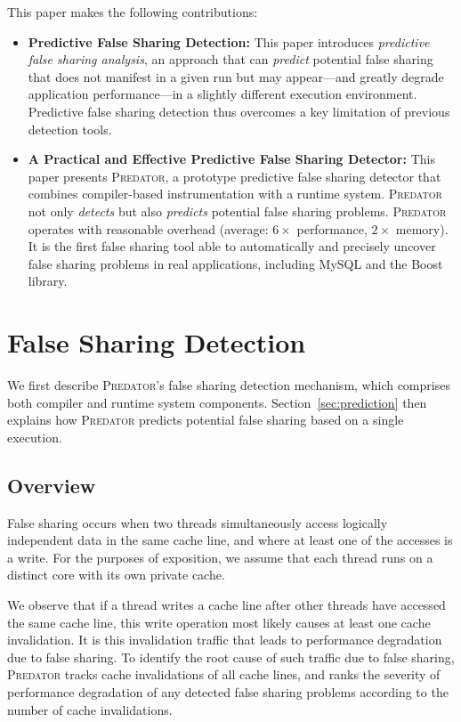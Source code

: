 \documentclass[10pt]{sigplanconf}
\newcommand{\Predator}{{\scshape Predator}}
\begin{document}
This paper makes the following contributions:

\begin{itemize}

\item
\textbf{Predictive False Sharing Detection:} This paper introduces \emph{predictive false sharing analysis}, an approach that can \emph{predict} potential false sharing that does not manifest in a given run but may appear---and greatly degrade application performance---in a slightly different execution environment. 
Predictive false sharing detection thus overcomes a key limitation of previous detection tools.

\item
\textbf{A Practical and Effective Predictive False Sharing Detector:} 
This paper presents \Predator{}, a prototype predictive false sharing detector that combines compiler-based instrumentation with a runtime system. \Predator{} not only \emph{detects} but also \emph{predicts} potential false sharing problems.
\Predator{} operates with reasonable overhead (average: $6\times$ performance, $2\times$ memory). It is the first false sharing tool able to automatically and precisely uncover
false sharing problems in real applications, including 
MySQL and the Boost library.

\end{itemize}

\section{False Sharing Detection}
\label{sec:detection}

We first describe \Predator{}'s false sharing detection mechanism, which comprises both compiler and runtime system
components. Section~\ref{sec:prediction} then explains how \Predator{} predicts potential false sharing based on a single execution.

\subsection{Overview}
\label{sec:overview}

False sharing occurs when two threads
simultaneously access logically independent data in the same cache line, and where at least one of the accesses is a write.
For the purposes of exposition, we assume that each thread runs on a distinct core with its own private cache.

We observe that 
if a thread writes a cache line after other threads have 
accessed the same cache line, this write operation most likely causes at least one cache invalidation. It is this invalidation traffic that leads to performance degradation due to false sharing. To identify the root cause of such traffic due to false sharing, \Predator{} tracks cache invalidations of all cache lines, and ranks the severity of performance degradation of any detected false sharing problems according to the number of cache invalidations. 
 
\end{document}
